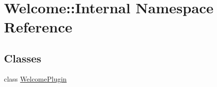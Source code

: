 \hypertarget{namespace_welcome_1_1_internal}{\section{\-Welcome\-:\-:\-Internal \-Namespace \-Reference}
\label{namespace_welcome_1_1_internal}
}
\subsection*{\-Classes}
\begin{DoxyCompactItemize}
\item 
class \hyperlink{class_welcome_1_1_internal_1_1_welcome_plugin}{\-Welcome\-Plugin}
\end{DoxyCompactItemize}

